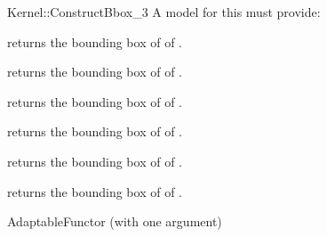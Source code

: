 \begin{ccRefFunctionObjectConcept}{Kernel::ConstructBbox_3}
A model for this must provide:



 {returns the bounding box of of .}

 {returns the bounding box of of .}

 {returns the bounding box of of .}

 {returns the bounding box of of .}

 {returns the bounding box of of .}

 {returns the bounding box of of .}


\ccRefines
AdaptableFunctor (with one argument)



\end{ccRefFunctionObjectConcept}
